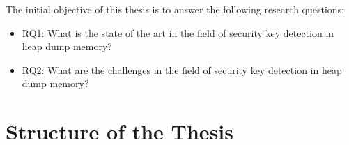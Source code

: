 The initial objective of this thesis is to answer the following research questions:
\begin{itemize}
	\item RQ1: What is the state of the art in the field of security key detection in heap dump memory?
	\item RQ2: What are the challenges in the field of security key detection in heap dump memory?
\end{itemize}

\section{Structure of the Thesis}


\begin{comment}
\section{Example citation \& symbol reference}\label{sec:citation}
For symbols look at \cite{latex_symbols_2017}.


\section{Example reference}
Example reference: Look at chapter~\ref{chap:introduction}, for sections, look at section~\ref{sec:citation}.

\section{Example image}

\begin{figure}
	\centering
	\texttt{[image: uni-logo]}
	\caption{Meaningful caption for this image}
	\label{fig:uniLogo}
\end{figure}

Example figure reference: Look at Figure~\ref{fig:uniLogo} to see an image. It can be \texttt{jpg}, \texttt{png}, or best: \texttt{pdf} (if vector graphic).

\section{Example table}

\begin{table}
	\centering
	\begin{tabular}{lr}
		First column & Number column \\
		\hline
		Accuracy & 0.532 \\
		F1 score & 0.87
	\end{tabular}
	\caption{Meaningful caption for this table}
	\label{tab:result}
\end{table}

Table~\ref{tab:result} shows a simple table\footnote{Check \url{https://en.wikibooks.org/wiki/LaTeX/Tables} on syntax}
\end{comment}

